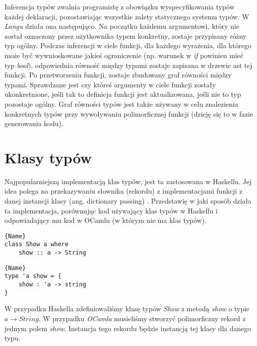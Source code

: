 \documentclass[declaration,shortabstract]{iithesis}
\begin{document}
Inferencja typów zwalnia programistę z obowiązku wyspecyfikowania typów 
każdej deklaracji, pozostawiając wszystkie zalety statycznego systemu typów.
W \textit{Langu} działa ona następująco. Na początku każdemu argumentowi,
który nie został oznaczony przez użytkownika typem konkretny, zostaje 
przypisany różny typ ogólny. Podczas inferencji w ciele funkcji, dla 
każdego wyrażenia, dla którego może być wywnioskowane jakieś ograniczenie 
(np. warunek w \textit{if} powinien mieć typ \textit{bool}), odpowiednia 
równość między typami zostaje zapisana w drzewie ast tej funkcji. Po 
przetworzeniu funkcji, zostaje zbudowany graf równości między typami. 
Sprawdzane jest czy któreś argumenty w ciele funkcji zostały ukonkretnione, 
jeśli tak to definicja funkcji jest aktualizowana, jeśli nie to typ pozostaje
ogólny. Graf równości typów jest także używany w celu znalezienia konkretnych 
typów przy wywoływaniu polimorficznej funkcji (dzieję się to w fazie 
generowania kodu). 

\section{Klasy typów}
Najpopularniejszą implementacją klas typów, jest ta zastosowana w Haskellu. 
Jej idea polega na przekazywaniu słownika (rekordu) z implementacjami funkcji 
z danej instancji klasy (ang. dictionary passing) 
\cite{type_class_wadler88, implementing_type_classes}. Przedstawię w jaki sposób 
działa ta implementacja, porównując kod używający klas typów w Haskellu i 
odpowiadający mu kod w OCamlu (w którym nie ma klas typów).

\noindent\begin{minipage}{.45\textwidth}
\begin{lstlisting}[caption=Deklaracja klasy typów w Haskellu, frame=tlrb]{Name}
class Show a where 
    show :: a -> String
\end{lstlisting}
\end{minipage}\hfill
\begin{minipage}{.45\textwidth}
\begin{lstlisting}[caption=Deklaracja odpowiednika klasy typów w OCamlu z
użyciem metody przekazywania słownika, frame=tlrb]{Name}
type 'a show = { 
    show : 'a -> string 
} 
\end{lstlisting}
\end{minipage}

W przypadku Haskella zdefiniowaliśmy klasę typów \textit{Show} z metodą 
\textit{show} o typie $a \rightarrow String$. W przypadku \textit
{OCamla} musieliśmy stworzyć polimorficzny rekord z jednym polem \textit{show}.
Instancja tego rekordu będzie instancją tej klasy dla danego typu. 
\end{document}
